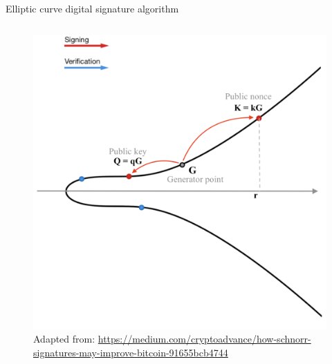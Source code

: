 \documentclass[slidescentered]{beamer}
\newcommand{\source}[1]{\caption*{\tiny Adapted from: {#1}} }
\begin{document}
\begin{frame}{Elliptic curve digital signature algorithm}
\begin{columns}
\begin{column}{0.5\linewidth}
\begin{figure}
{				\source{\tiny \url{https://medium.com/cryptoadvance/how-schnorr-signatures-may-improve-bitcoin-91655bcb4744}}}
				 {\vspace*{-0.7cm}
					\hspace*{-1.7cm}
					\includegraphics[scale=0.29]{images/ECDSA4}
				\source{\tiny \url{https://medium.com/cryptoadvance/how-schnorr-signatures-may-improve-bitcoin-91655bcb4744}}}
				\end{figure}
			\end{column}
		\end{columns}
	\end{frame}
\end{document}

